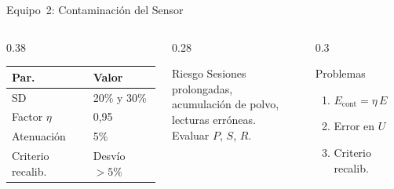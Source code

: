 \documentclass[aspectratio=169,12pt]{beamer}
\begin{document}
\begin{frame}{Equipo~2: Contaminación del Sensor}
	\begin{columns}
		\begin{column}{0.38\textwidth}
			\centering\scriptsize
			\begin{tabular}{ll}
				\toprule
				\textbf{Par.}     & \textbf{Valor} \\
				\midrule
				SD                & 20\% y 30\%    \\
				Factor $\eta$     & 0,95           \\
				Atenuación        & 5\%            \\
				Criterio recalib. & Desvío $> 5\%$ \\
				\bottomrule
			\end{tabular}
		\end{column}
		\begin{column}{0.28\textwidth}
			\begin{alertblock}{\scriptsize Riesgo}
				\scriptsize
				Sesiones prolongadas,\\
				acumulación de polvo,\\
				lecturas erróneas.\\
				Evaluar $P$, $S$, $R$.
			\end{alertblock}
		\end{column}
		\begin{column}{0.3\textwidth}
			\begin{exampleblock}{\scriptsize Problemas}
				\scriptsize
				\begin{enumerate}
					\item[B.1] $E_\mathrm{cont} = \eta\,E$
					\item[B.2] Error en $U$
					\item[B.3] Criterio recalib.
				\end{enumerate}
			\end{exampleblock}
		\end{column}
	\end{columns}
\end{frame}
\end{document}
